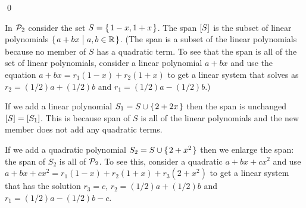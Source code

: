 \documentclass[10pt,t,serif,professionalfont]{beamer}
\begin{document}
\begin{frame}
\lm[lm:ExpandSpanByAddingNonRepeat]

\pause
\pf
{}

\pause
{}

\pause
{}
\qed
\end{frame}



\begin{frame}
\ex 
In $\mathcal{P}_2$ consider the set $S=\mbox{$\{\hspace{0.1em}1-x,1+x\hspace{0.1em}\}$}$.
The span $\relax [S\relax ]$ is the subset of
linear polynomials $\mbox{$\{\hspace{0.1em}a+bx\bigm| a,b\in\mathbb{R}\hspace{0.1em}\}$}$.
(The span is a subset of the linear polynomials because no member of
$S$ has a quadratic term.
To see that the span is all of the set of linear polynomials, consider 
a linear polynomial $a+bx$ and use
the equation $a+bx=r_1(1-x)+r_2(1+x)$ to get a linear system
that solves as $r_2=(1/2)a+(1/2)b$ and 
$r_1=(1/2)a-(1/2)b$.)  

\pause
If we add a linear polynomial $S_1=S\cup\mbox{$\{\hspace{0.1em}2+2x\hspace{0.1em}\}$}$
then the span is unchanged $\relax [S\relax ]=\relax [S_1\relax ]$.
This is because span of $S$ is all of the linear polynomials 
and the new 
member does not add any quadratic terms.

\pause
If we add a quadratic polynomial 
$S_2=S\cup\mbox{$\{\hspace{0.1em}2+x^2\hspace{0.1em}\}$}$ then we enlarge the span: 
the span of $S_2$ is all of $\mathcal{P}_2$.
To see this, consider a quadratic $a+bx+cx^2$ and use  
$a+bx+cx^2=r_1(1-x)+r_2(1+x)+r_3(2+x^2)$ to get a linear system
that has the solution $r_3=c$, $r_2=(1/2)a+(1/2)b$ and $r_1=(1/2)a-(1/2)b-c$.
\end{frame}
\end{document}
